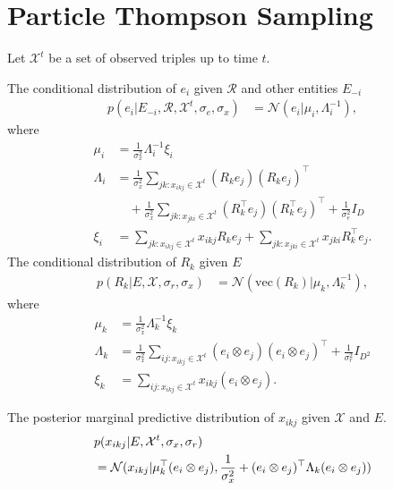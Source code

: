 \section{Particle Thompson Sampling}
Let $\mathcal{X}^{t}$ be a set of observed triples up to time $t$.

The conditional distribution of $e_i$ given $\mathcal{R}$ and other entities $E_{-i}$
\begin{align} \label{eqn:sample_e}
p(e_i |E_{-i}, \mathcal{R}, \mathcal{X}^{t}, \sigma_e, \sigma_x) &= \mathcal{N}(e_i | \mu_i, \Lambda_i^{-1}),
\end{align}
where
\begin{align*}
\mu_i &= \frac{1}{\sigma_x^2}\Lambda_i^{-1}\xi_i \\
\Lambda_i &= \frac{1}{\sigma_x^2} \sum_{jk : x_{ikj} \in \mathcal{X}^{t}} (R_k e_j)(R_k e_j)^\top \\
&\quad+ \frac{1}{\sigma_x^2} \sum_{jk : x_{jki} \in \mathcal{X}^{t}} (R_k^\top e_j)(R_k^\top e_j)^\top+ \frac{1}{\sigma_e^2} {I}_D \\
\xi_i &= \sum_{jk : x_{ikj} \in \mathcal{X}^{t}}  x_{ikj} R_{k} e_{j} + \sum_{jk : x_{jki} \in \mathcal{X}^{t}} x_{jki} R_{k}^\top e_{j}.
\end{align*}
The conditional distribution of $R_k$ given $E$
\begin{align}
\label{eqn:sample_r}
p(R_k|E, \mathcal{X}, \sigma_r, \sigma_x)  &= \mathcal{N}(\text{vec}(R_k) | \mu_k, \Lambda_k^{-1}),
\end{align}
where
\begin{align*}
\mu_k &= \frac{1}{\sigma_x^2}\Lambda_k^{-1}\xi_k \\
\Lambda_k &= \frac{1}{\sigma_x^2} \sum_{ij:x_{ikj} \in \mathcal{X}^{t}} (e_i \otimes e_j)(e_i \otimes e_j)^\top + \frac{1}{\sigma_r^2} {I}_{D^2} \\
\xi_k &= \sum_{ij:x_{ikj} \in \mathcal{X}^{t}} x_{ikj} (e_{i} \otimes e_{j}).
\end{align*}

The posterior marginal predictive distribution of $x_{ikj}$ given $\mathcal{X}$ and $E$.
\begin{align}
\label{eqn:marginal_predict}
&p(x_{ikj}| E, \mathcal{X}^{t}, \sigma_x, \sigma_r) \\
&= \mathcal{N}(x_{ikj}| \mu_k ^\top (e_i \otimes e_j), \frac{1}{\sigma_x^2} +  (e_i \otimes e_j)^\top \Lambda_k (e_i \otimes e_j)) \notag
\end{align}

